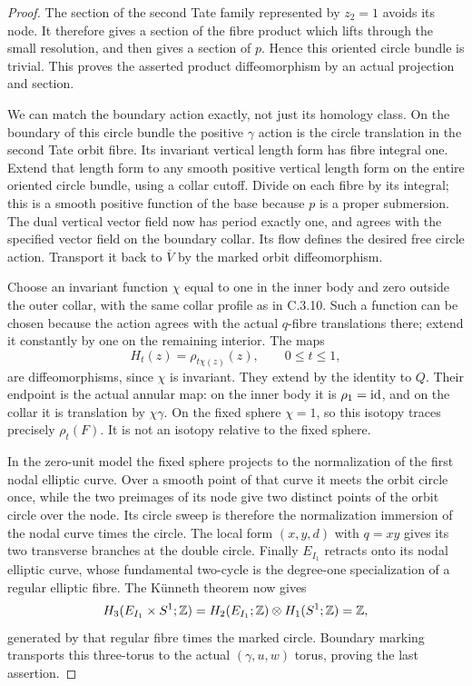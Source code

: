 \begin{proof}
The section of the second Tate family represented by $z_2=1$
avoids its node. It therefore gives a section of the fibre
product which lifts through the small resolution, and then
gives a section of $p$. Hence this oriented circle bundle is
trivial. This proves the asserted product diffeomorphism by
an actual projection and section.

We can match the boundary action exactly, not just its homology
class. On the boundary of this circle bundle the positive
$\gamma$ action is the circle translation in the second Tate
orbit fibre. Its invariant vertical length form has fibre
integral one. Extend that length form to any smooth positive
vertical length form on the entire oriented circle bundle,
using a collar cutoff. Divide on each fibre by its integral;
this is a smooth positive function of the base because $p$
is a proper submersion. The dual vertical vector field now has
period exactly one, and agrees with the specified vector field
on the boundary collar. Its flow defines the desired free
circle action. Transport it back to $\overline V$ by the marked
orbit diffeomorphism.

Choose an invariant function $\chi$ equal to one in the inner
body and zero outside the outer collar, with the same collar
profile as in C.3.10. Such a function can be chosen because
the action agrees with the actual $q$-fibre translations there;
extend it constantly by one on the remaining interior. The
maps
\[
 H_t(z)=\rho_{t\chi(z)}(z),\qquad 0\leq t\leq1,
\]
are diffeomorphisms, since $\chi$ is invariant. They extend
by the identity to $Q$. Their endpoint is the actual annular
map: on the inner body it is $\rho_1=\mathrm{id}$, and on the collar
it is translation by $\chi\gamma$. On the fixed sphere
$\chi=1$, so this isotopy traces precisely $\rho_t(F)$.
It is not an isotopy relative to the fixed sphere.

In the zero-unit model the fixed sphere projects to the
normalization of the first nodal elliptic curve. Over a smooth
point of that curve it meets the orbit circle once, while the
two preimages of its node give two distinct points of the
orbit circle over the node. Its circle sweep is therefore the
normalization immersion of the nodal curve times the circle.
The local form $(x,y,d)$ with $q=xy$ gives its two transverse
branches at the double circle. Finally $E_{I_1}$ retracts onto
its nodal elliptic curve, whose fundamental two-cycle is the
degree-one specialization of a regular elliptic fibre. The
K\"unneth theorem now gives
\[
 H_3(E_{I_1}\times S^1;\mathbb Z)
 =H_2(E_{I_1};\mathbb Z)\otimes H_1(S^1;\mathbb Z)=\mathbb Z,
\]
generated by that regular fibre times the marked circle.
Boundary marking transports this three-torus to the actual
$(\gamma,u,w)$ torus, proving the last assertion.
\end{proof}

